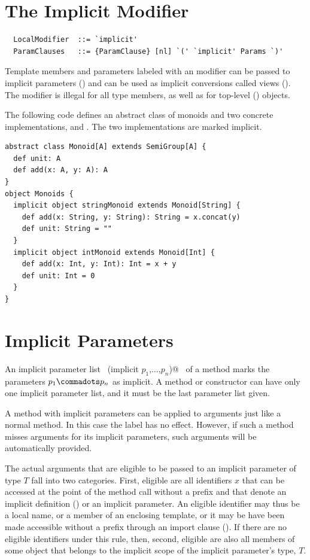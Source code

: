 \section{The Implicit Modifier}\label{sec:impl-defs}

\syntax\begin{lstlisting}
  LocalModifier  ::= `implicit'
  ParamClauses   ::= {ParamClause} [nl] `(' `implicit' Params `)'
\end{lstlisting}

Template members and parameters labeled with an 
modifier can be passed to implicit parameters ()
and can be used as implicit conversions called views
(). The  modifier is illegal for all
type members, as well as for top-level ()
objects.

\example\label{ex:impl-monoid}
The following code defines an abstract class of monoids and
two concrete implementations,  and
. The two implementations are marked implicit.

\begin{lstlisting}
abstract class Monoid[A] extends SemiGroup[A] {
  def unit: A
  def add(x: A, y: A): A
}
object Monoids {
  implicit object stringMonoid extends Monoid[String] {
    def add(x: String, y: String): String = x.concat(y)
    def unit: String = ""
  }
  implicit object intMonoid extends Monoid[Int] {
    def add(x: Int, y: Int): Int = x + y
    def unit: Int = 0
  }
}
\end{lstlisting}

\section{Implicit Parameters}\label{sec:impl-params}

An implicit parameter list
~\lstinline@(implicit $p_1$,$\ldots$,$p_n$)@~ of a method marks the parameters $p_1 \commadots p_n$ as
implicit. A method or constructor can have only one implicit parameter
list, and it must be the last parameter list given.

A method with implicit parameters can be applied to arguments just
like a normal method. In this case the  label has no
effect. However, if such a method misses arguments for its implicit
parameters, such arguments will be automatically provided.

The actual arguments that are eligible to be passed to an implicit
parameter of type $T$ fall into two categories. First, eligible are
all identifiers $x$ that can be accessed at the point of the method
call without a prefix and that denote an implicit definition
() or an implicit parameter.  An eligible
identifier may thus be a local name, or a member of an enclosing
template, or it may be have been made accessible without a prefix
through an import clause (). If there are no eligible
identifiers under this rule, then, second, eligible are also all
 members of some object that belongs to the implicit
scope of the implicit parameter's type, $T$.

